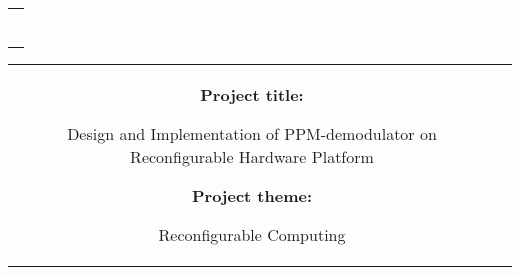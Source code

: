 \begin{titlepage}
\begin{nopagebreak}
{\samepage 
\begin{tabular}{r}
\parbox{\textwidth}{ %
\hfill \parbox{7cm}{\begin{tabular}{l}
\end{tabular}}}
\end{tabular}

\begin{tabular}{cc}
\parbox{8cm}{
\vspace{-8mm}
\begin{description}

\item {\bf Project title:}
\vspace{-10pt}
\begin{flushleft}
Design and Implementation of PPM-demodulator on Reconfigurable Hardware Platform
\end{flushleft}
 \vspace{-5pt}
\item {\bf Project theme:}
\vspace{-10pt}
\begin{flushleft}
Reconfigurable
Computing
\end{flushleft}
\end{description}
 \vspace{-5pt}
\parbox{9cm}{

}}
\end{tabular}}
\end{nopagebreak}
\end{titlepage}

